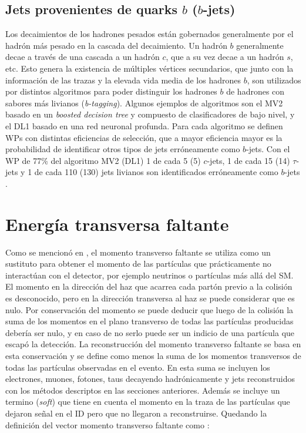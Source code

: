 \subsection{Jets provenientes de quarks $b$ ($b$-jets)}

Los decaimientos de los hadrones pesados están gobernados generalmente por el hadrón más pesado en la cascada del decaimiento. Un hadrón $b$ generalmente decae a través de una cascada a un hadrón $c$, que a su vez decae a un hadrón $s$, etc. Esto genera la existencia de múltiples vértices secundarios, que junto con la información de las trazas y la elevada vida media de los hadrones $b$, son utilizados por distintos algoritmos para poder distinguir los hadrones $b$ de hadrones con sabores más livianos (\textit{b-tagging}). Algunos ejemplos de algoritmos \cite{btag} son el MV2 basado en un \textit{boosted decision tree} y compuesto de clasificadores de bajo nivel, y el DL1 basado en una red neuronal profunda. Para cada algoritmo se definen WPs con distintas eficiencias de selección, que a mayor eficiencia mayor es la probabilidad de identificar otros tipos de jets erróneamente como $b$-jets. Con el WP de 77\% del algoritmo MV2 (DL1) 1 de cada 5 (5) $c$-jets, 1 de cada 15 (14) $\tau$-jets y 1 de cada 110 (130) jets livianos son identificados erróneamente como $b$-jets \cite{btag}.



\section{Energía transversa faltante}


Como se mencionó en , el momento transverso faltante se utiliza como un sustituto para obtener el momento de las partículas que prácticamente no interactúan con el detector, por ejemplo neutrinos o partículas más allá del SM. El momento en la dirección del haz que acarrea cada partón previo a la colisión es desconocido, pero en la dirección transversa al haz se puede considerar que es nulo. Por conservación del momento se puede deducir que luego de la colisión la suma de los momentos en el plano transverso de todas las partículas producidas debería ser nulo, y en caso de no serlo puede ser un indicio de una partícula que escapó la detección. La reconstrucción del momento transverso faltante se basa en esta conservación y se define como menos la suma de los momentos transversos de todas las partículas observadas en el evento. En esta suma se incluyen los electrones, muones, fotones, taus decayendo hadrónicamente y jets reconstruidos con los métodos descriptos en las secciones anteriores. Además se incluye un termino (\textit{soft}) que tiene en cuenta el momento en la traza de las partículas que dejaron señal en el ID pero que no llegaron a reconstruirse. Quedando la definición del vector momento transverso faltante como \cite{PERF-2016-07}:

